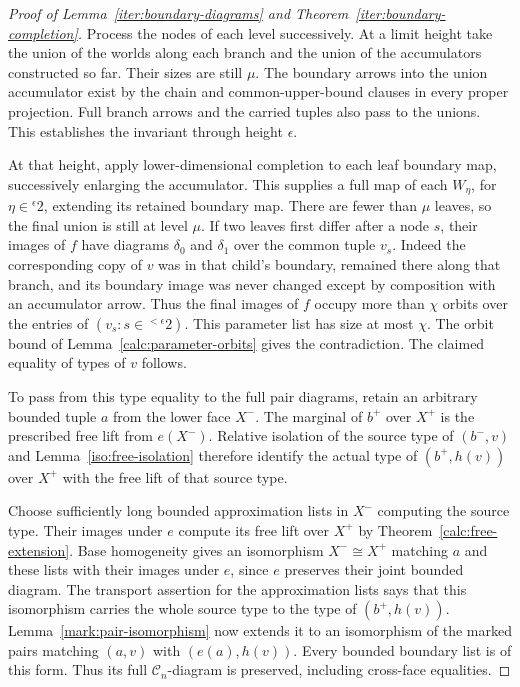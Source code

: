 \begin{proof}[Proof of Lemma~\ref{iter:boundary-diagrams} and
Theorem~\ref{iter:boundary-completion}]
Process the nodes of each level successively. At a limit
height take the union of the worlds along each branch and
the union of the accumulators constructed so far. Their
sizes are still $\mu$. The boundary arrows into the union
accumulator exist by the chain and common-upper-bound clauses
in every proper projection. Full branch arrows and the
carried tuples also pass to the unions. This establishes
the invariant through height $\epsilon$.

At that height, apply lower-dimensional completion to each
leaf boundary map, successively enlarging the accumulator.
This supplies a full map of each $W_\eta$, for
$\eta\in{}^\epsilon2$, extending its retained boundary
map. There are fewer than $\mu$ leaves, so the final union
is still at level $\mu$. If two leaves first differ after
a node $s$, their images of $f$ have diagrams $\delta_0$
and $\delta_1$ over the common tuple $v_s$. Indeed the
corresponding copy of $v$ was in that child's boundary,
remained there along that branch, and its boundary image was never
changed except by composition with an accumulator arrow.
Thus the final images of $f$ occupy more than $\chi$
orbits over the entries of $(v_s:s\in{}^{<\epsilon}2)$.
This parameter list has size at most $\chi$. The orbit
bound of Lemma~\ref{calc:parameter-orbits} gives the
contradiction. The claimed equality of types of $v$ follows.

To pass from this type equality to the full pair diagrams, retain
an arbitrary bounded tuple $a$ from the lower face $X^-$.
The marginal of $b^+$ over
$X^+$ is the prescribed free lift from $e(X^-)$.
Relative isolation of the source type of $(b^-,v)$ and
Lemma~\ref{iso:free-isolation} therefore identify the actual type
of $(b^+,h(v))$ over $X^+$ with the free lift of that source type.

Choose sufficiently long bounded approximation lists in $X^-$
computing the source type.  Their images under $e$ compute its
free lift over $X^+$ by Theorem~\ref{calc:free-extension}.
Base homogeneity gives an isomorphism $X^-\cong X^+$ matching
$a$ and these lists with their images under $e$, since $e$
preserves their joint bounded diagram.  The transport assertion
for the approximation lists says that this isomorphism carries
the whole source type to the type of $(b^+,h(v))$.
Lemma~\ref{mark:pair-isomorphism} now extends it to an isomorphism
of the marked pairs matching $(a,v)$ with $(e(a),h(v))$.
Every bounded boundary list is of this form.  Thus its full
$\mathcal C_n$-diagram is preserved, including cross-face equalities.


\end{proof}
